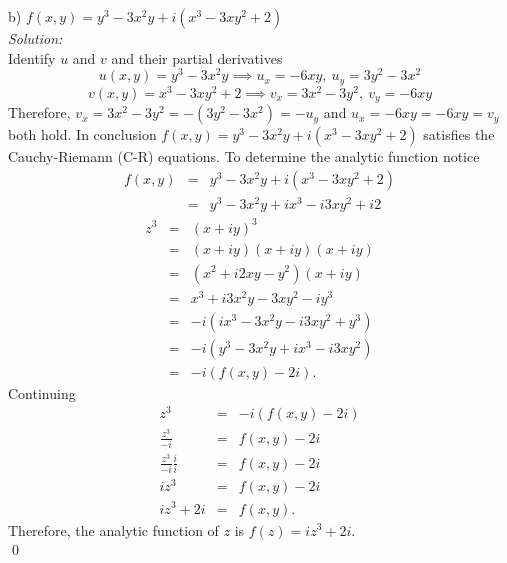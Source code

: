 \documentclass[10pt]{amsart}
\theoremstyle{nonumberplain}
\begin{document}
\begin{enumerate}[label={\bf {\arabic*}:}]
\noindent
b) $f(x, y) = y^3 - 3x^2y + i(x^3 - 3xy^2 + 2)$ \\
\textit{Solution:} \\
Identify $u$ and $v$ and their partial derivatives
$$ u(x,y) = y^3 - 3x^2y \implies u_x = -6xy, \: u_y = 3y^2 -3x^2$$
$$v(x,y) = x^3 - 3xy^2 + 2 \implies v_x = 3x^2 - 3y^2, \: v_y = -6xy$$
Therefore, $v_x = 3x^2 - 3y^2 = - (3y^2 -3x^2) = - u_y$ and $u_x = -6xy = -6xy = v_y$ both hold.
In conclusion $f(x, y) = y^3 - 3x^2y + i(x^3 - 3xy^2 + 2)$ satisfies the Cauchy-Riemann (C-R) equations.
To determine the analytic function notice
\begin{eqnarray*}
f(x, y) &=& y^3 - 3x^2y + i(x^3 - 3xy^2 + 2) \\
	 &=& y^3 - 3x^2y + ix^3 - i3xy^2 + i2
\end{eqnarray*}
\begin{eqnarray*}
z^3 &=& (x + iy)^3 \\
      &=& (x + iy)(x + iy)(x + iy) \\
      &=& (x^2 + i2xy - y^2)(x + iy) \\
      &=& x^3 + i3x^2y - 3xy^2 - iy^3 \\
      &=& -i(ix^3 - 3x^2y - i3xy^2 + y^3) \\
      &=& -i(y^3 - 3x^2y + ix^3 - i3xy^2) \\
      &=& -i(f(x,y) - 2i).
\end{eqnarray*}
Continuing
\begin{eqnarray*}
z^3 &=& -i(f(x,y) - 2i) \\
\frac{z^3}{-i} &=& f(x,y) - 2i \\
\frac{z^3}{-i}\frac{i}{i} &=& f(x,y) - 2i \\
iz^3 &=& f(x,y) - 2i \\
iz^3 + 2i &=& f(x,y).
\end{eqnarray*}
Therefore, the analytic function of $z$ is $f(z) = iz^3 + 2i$. \\
\qed


\end{enumerate}
\end{document}
